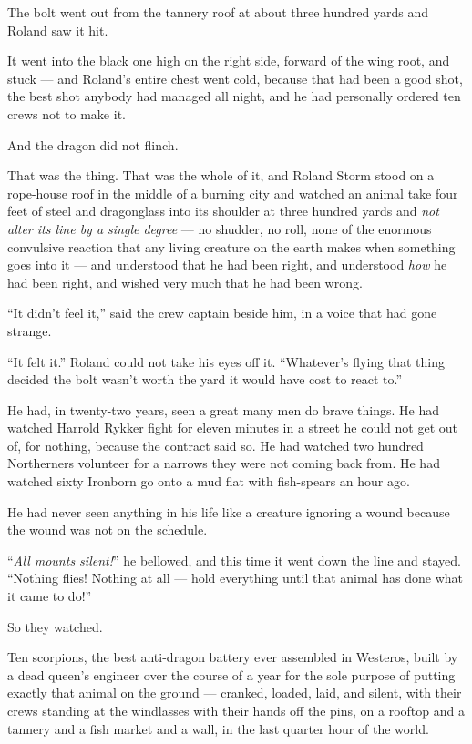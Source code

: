The bolt went out from the tannery roof at about three hundred yards and Roland saw it hit.

It went into the black one high on the right side, forward of the wing root, and stuck — and Roland’s entire chest went cold, because that had been a good shot, the best shot anybody had managed all night, and he had personally ordered ten crews not to make it.

And the dragon did not flinch.

That was the thing. That was the whole of it, and Roland Storm stood on a rope-house roof in the middle of a burning city and watched an animal take four feet of steel and dragonglass into its shoulder at three hundred yards and \textit{not alter its line by a single degree} — no shudder, no roll, none of the enormous convulsive reaction that any living creature on the earth makes when something goes into it — and understood that he had been right, and understood \textit{how} he had been right, and wished very much that he had been wrong.

“It didn’t feel it,” said the crew captain beside him, in a voice that had gone strange.

“It felt it.” Roland could not take his eyes off it. “Whatever’s flying that thing decided the bolt wasn’t worth the yard it would have cost to react to.”

He had, in twenty-two years, seen a great many men do brave things. He had watched Harrold Rykker fight for eleven minutes in a street he could not get out of, for nothing, because the contract said so. He had watched two hundred Northerners volunteer for a narrows they were not coming back from. He had watched sixty Ironborn go onto a mud flat with fish-spears an hour ago.

He had never seen anything in his life like a creature ignoring a wound because the wound was not on the schedule.

“\textit{All mounts silent!}” he bellowed, and this time it went down the line and stayed. “Nothing flies! Nothing at all — hold everything until that animal has done what it came to do!”

\sceneBreak

So they watched.

Ten scorpions, the best anti-dragon battery ever assembled in Westeros, built by a dead queen’s engineer over the course of a year for the sole purpose of putting exactly that animal on the ground — cranked, loaded, laid, and silent, with their crews standing at the windlasses with their hands off the pins, on a rooftop and a tannery and a fish market and a wall, in the last quarter hour of the world.

